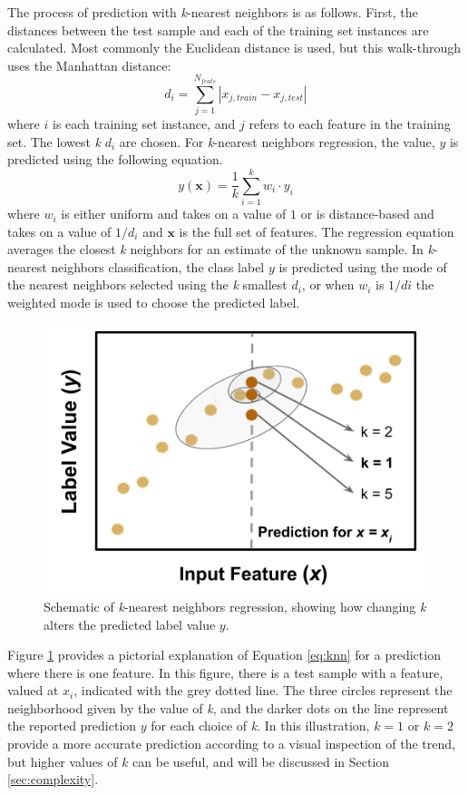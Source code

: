 The process of prediction with \textit{k}-nearest neighbors is as follows.
First, the distances between the test sample and each of the training set
instances are calculated.  Most commonly the Euclidean distance is used, but
this walk-through uses the Manhattan distance:
\begin{equation}
  d_{i} = \sum_{j=1}^{N_{feats}} |x_{j,train} - x_{j,test}|
  \label{eq:l1}
\end{equation}
where $i$ is each training set instance, and $j$ refers to each feature in the
training set.  The lowest \textit{k} $d_{i}$ are chosen. For \textit{k}-nearest
neighbors regression, the value, $y$ is predicted using the following equation.
\begin{equation}
  y(\boldsymbol{x}) = \frac{1}{k} \sum_{i=1}^{k} w_i \cdot y_i
  \label{eq:knn}
\end{equation}
where $w_{i}$ is either uniform and takes on a value of $1$ or is
distance-based and takes on a value of $1/d_{i}$ and $\boldsymbol{x}$ is the
full set of features. The regression equation averages the closest \textit{k}
neighbors for an estimate of the unknown sample.  In \textit{k}-nearest
neighbors classification, the class label $y$ is predicted using the mode of
the nearest neighbors selected using the \textit{k} smallest $d_i$, or when
$w_i$ is $1/d{i}$ the weighted mode is used to choose the predicted label.

\begin{figure}[!htb]
  \centering
  \includegraphics[width=0.8\linewidth]{./chapters/litrev/nn-fig.png}
  \caption{Schematic of \textit{k}-nearest neighbors regression, showing how 
           changing \textit{k} alters the predicted label value $y$.}
  \label{fig:nn}
\end{figure}

Figure \ref{fig:nn} provides a pictorial explanation of Equation \ref{eq:knn}
for a prediction where there is one feature. In this figure, there is a test
sample with a feature, valued at $x_i$, indicated with the grey dotted line.
The three circles represent the neighborhood given by the value of \textit{k},
and the darker dots on the line represent the reported prediction $y$ for each
choice of \textit{k}.  In this illustration, $k=1$ or $k=2$ provide a more
accurate prediction according to a visual inspection of the trend, but higher
values of $k$ can be useful, and will be discussed in Section
\ref{sec:complexity}.

